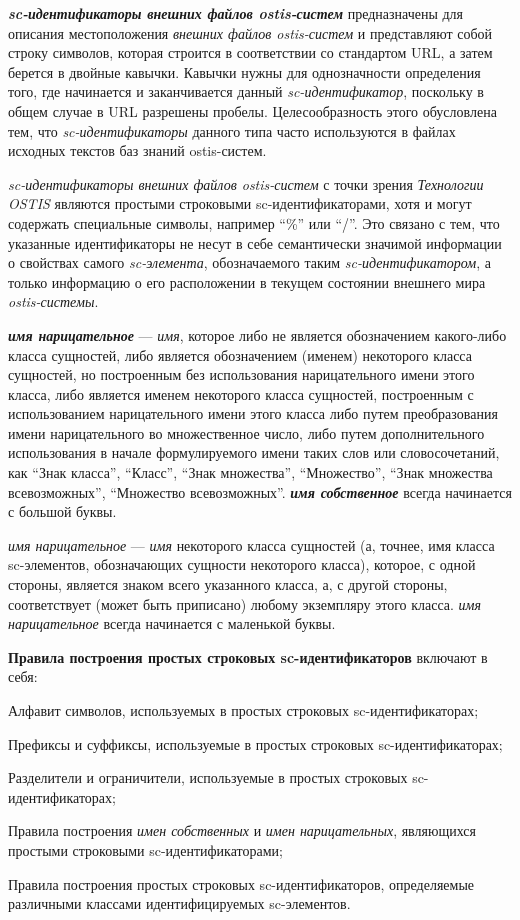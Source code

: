 \textbf{\textit{sc-идентификаторы внешних файлов ostis-систем}} предназначены для описания местоположения \textit{внешних файлов ostis-систем} и представляют собой строку символов, которая строится в соответствии со стандартом URL, а затем берется в двойные кавычки. Кавычки нужны для однозначности определения того, где начинается и заканчивается данный \textit{sc-идентификатор}, поскольку в общем случае в URL разрешены пробелы. Целесообразность этого обусловлена тем, что \textit{sc-идентификаторы} данного типа часто используются в файлах исходных текстов баз знаний ostis-систем.

\textit{sc-идентификаторы внешних файлов ostis-систем} с точки зрения \textit{Технологии OSTIS} являются простыми строковыми sc-идентификаторами, хотя и могут содержать специальные символы, например ``\%'' или ``/''. Это связано с тем, что указанные идентификаторы не несут в себе семантически значимой информации о свойствах самого \textit{sc-элемента}, обозначаемого таким \textit{sc-идентификатором}, а только информацию о его расположении в текущем состоянии внешнего мира \textit{ostis-системы}.

\textbf{\textit{имя нарицательное}} --- \textit{имя}, которое либо не является обозначением какого-либо класса сущностей, либо является обозначением (именем) некоторого класса сущностей, но построенным без использования нарицательного имени этого класса, либо является именем некоторого класса сущностей, построенным с использованием нарицательного имени этого класса либо путем преобразования имени нарицательного во множественное число, либо путем дополнительного использования в начале формулируемого имени таких слов или словосочетаний, как ``Знак класса'', ``Класс'', ``Знак множества'', ``Множество'', ``Знак множества всевозможных'', ``Множество всевозможных''. \textbf{\textit{имя собственное}} всегда начинается с большой буквы.

\textit{имя нарицательное} --- \textit{имя} некоторого класса сущностей (а, точнее, имя класса sc-элементов, обозначающих сущности некоторого класса), которое, с одной стороны, является знаком всего указанного класса, а, с другой стороны, соответствует (может быть приписано) любому экземпляру этого класса. \textit{имя нарицательное} всегда начинается с маленькой буквы.

\textbf{Правила построения простых строковых sc-идентификаторов} включают в себя:
\begin{textitemize}
	\item Алфавит символов, используемых в простых строковых sc-идентификаторах;
	\item Префиксы и суффиксы, используемые в простых строковых sc-идентификаторах;
	\item Разделители и ограничители, используемые в простых строковых sc-идентификаторах;
	\item Правила построения \textit{имен собственных} и \textit{имен нарицательных}, являющихся простыми строковыми sc-идентификаторами;
	\item Правила построения простых строковых sc-идентификаторов, определяемые различными классами идентифицируемых sc-элементов.
\end{textitemize}

